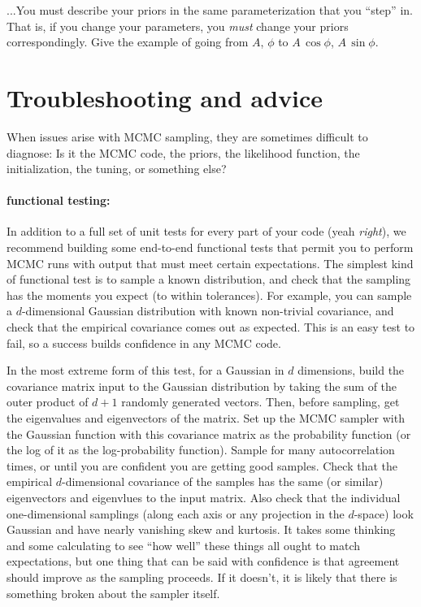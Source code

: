 \documentclass[12pt,twoside,pdftex]{article}
\begin{document}
...You must describe your priors in the same parameterization that you ``step'' in.
That is, if you change your parameters, you \emph{must} change your priors correspondingly.
Give the example of going from $A$, $\phi$ to $A\,\cos\phi$, $A\,\sin\phi$.

\section{Troubleshooting and advice}\label{sec:troubleshooting}

When issues arise with MCMC sampling,
  they are sometimes difficult to diagnose:
Is it the MCMC code, the priors, the likelihood function,
  the initialization, the tuning, or something else?

\paragraph{functional testing:}
In addition to a full set of unit tests for every part of your code
  (yeah \emph{right}),
  we recommend building some end-to-end functional tests that permit you to perform MCMC
  runs with output that must meet certain expectations.
The simplest kind of functional test is to sample a known distribution,
  and check that the sampling has the moments you expect (to within tolerances).
For example, you can sample a $d$-dimensional Gaussian distribution with known non-trivial covariance,
  and check that the empirical covariance comes out as expected.
This is an easy test to fail, so a success builds confidence in any MCMC code.

In the most extreme form of this test,
  for a Gaussian in $d$ dimensions,
  build the covariance matrix input to the Gaussian distribution
  by taking the sum of the outer product of $d+1$ randomly generated vectors.
Then, before sampling, get the eigenvalues and eigenvectors of the matrix.
Set up the MCMC sampler with the Gaussian function with this covariance matrix
  as the probability function (or the log of it as the log-probability function).
Sample for many autocorrelation times,
  or until you are confident you are getting good samples.
Check that the empirical $d$-dimensional covariance of the samples
  has the same (or similar) eigenvectors and eigenvlues to the input matrix.
Also check that the individual one-dimensional samplings
  (along each axis or any projection in the $d$-space)
  look Gaussian and have nearly vanishing skew and kurtosis.
It takes some thinking and some calculating to see ``how well'' these things all ought to match
  expectations, but one thing that can be said with confidence is that agreement should improve
  as the sampling proceeds.
If it doesn't, it is likely that there is something broken about the sampler itself.
\end{document}
